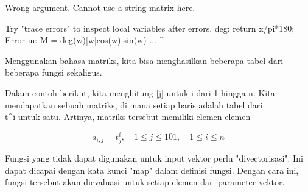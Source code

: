 \documentclass[a4paper,10pt]{article}
\begin{document}
\begin{eulernotebook}
\begin{eulercomment}
\begin{eulercomment}
\begin{eulercomment}
\begin{eulercomment}
\begin{eulercomment}
\begin{eulercomment}
\begin{eulercomment}
\begin{eulercomment}
\begin{eulercomment}
\begin{eulercomment}
\begin{eulercomment}
\begin{eulercomment}
\begin{eulercomment}
\begin{eulercomment}
\begin{eulercomment}
\begin{eulercomment}
\begin{eulercomment}
\begin{eulercomment}
\begin{eulercomment}
\begin{eulercomment}
\begin{euleroutput}
  Wrong argument.
  Cannot use a string matrix here.
  
  Try "trace errors" to inspect local variables after errors.
  deg:
      return x/pi*180;
  Error in:
  M = deg(w)|w|cos(w)|sin(w) ...
            ^
\end{euleroutput}
\begin{eulercomment}
Menggunakan bahasa matriks, kita bisa menghasilkan beberapa tabel dari
beberapa fungsi sekaligus.

Dalam contoh berikut, kita menghitung [j] untuk i dari 1 hingga n.
Kita mendapatkan sebuah matriks, di mana setiap baris adalah tabel
dari\\
t\textasciicircum{}i untuk satu. Artinya, matriks tersebut memiliki elemen-elemen

\end{eulercomment}
\begin{eulerformula}
\[
a_{i,j} = t_j^i, \quad 1 \le j \le 101, \quad 1 \le i \le n
\]
\end{eulerformula}
\begin{eulercomment}
Fungsi yang tidak dapat digunakan untuk input vektor perlu
"divectorisasi". Ini dapat dicapai dengan kata kunci "map" dalam
definisi fungsi. Dengan cara ini, fungsi tersebut akan dievaluasi
untuk setiap elemen dari parameter vektor.


\end{eulercomment}
\end{eulercomment}
\end{eulercomment}
\end{eulercomment}
\end{eulercomment}
\end{eulercomment}
\end{eulercomment}
\end{eulercomment}
\end{eulercomment}
\end{eulercomment}
\end{eulercomment}
\end{eulercomment}
\end{eulercomment}
\end{eulercomment}
\end{eulercomment}
\end{eulercomment}
\end{eulercomment}
\end{eulercomment}
\end{eulercomment}
\end{eulercomment}
\end{eulercomment}
\end{eulernotebook}
\end{document}
